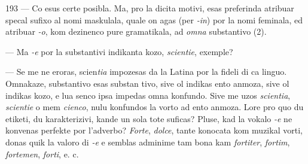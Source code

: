 \begin{VUpage}[197]{193}
--- Co esus certe posibla. Ma, pro la dicita motivi, esas\nl
preferinda atribuar specal sufixo al nomi maskulala, quale\nl
on agas (per \textit{-in}) por la nomi feminala, ed atribuar \textit{-o}, kom\nl
dezinenco pure gramatikala, ad \textit{omna} substantivo (2).

--- Ma \textit{-e} por la substantivi indikanta kozo, \textit{scientie},\nl
exemple?

--- Se me ne eroras, scien\textit{tia} impozesas da la Latina por\nl
la fideli di ca linguo. Omnakaze, substantivo esas substan\cc
tivo, sive ol indikas ento anmoza, sive ol indikas kozo, e lua\nl
senco ipsa impedas omna konfundo. Sive me uzos \textit{scientia},\nl
\textit{scientie} o mem \textit{cienco}, nulu konfundos la vorto ad ento\nl
anmoza. Lore pro quo du etiketi, du karakterizivi, kande\nl
un sola tote suficas? Pluse, kad la vokalo \textit{-e} ne konvenas\nl
perfekte por l'adverbo? \textit{Forte}, \textit{dolce}, tante konocata kom\nl
muzikal vorti, donas quik la valoro di \textit{-e} e semblas adminime\nl
tam bona kam \textit{fortiter}, \textit{fortim}, \textit{fortemen}, \textit{forti}, e. c.
\end{VUpage}

